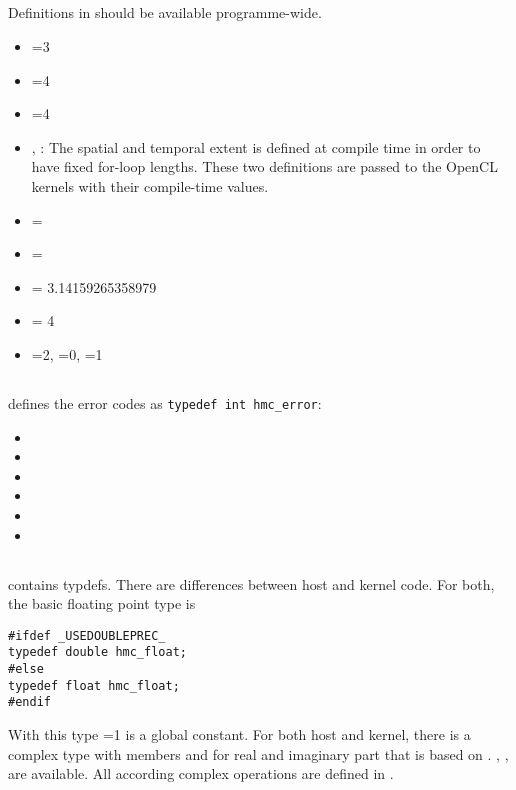 \subsection{}
Definitions in  should be available programme-wide.
\begin{itemize}
\item {}=3
\item {}=4
\item {}=4
\item {}, : The spatial and temporal extent is defined at compile time in order to have fixed for-loop lengths. These two definitions are passed to the OpenCL kernels with their compile-time values.
\item {} = 
\item {} = 
\item {} = 3.14159265358979
\item {} = 4
\item {}=2, =0, =1
\end{itemize}

\subsection{}
 defines the error codes as \verb+typedef int hmc_error+:
\begin{itemize}
\item {}
\item {}
\item {}
\item {}
\item {}
\item {}
\end{itemize}

\subsection{}
 contains typdefs. There are differences between host and kernel code. For both, the basic floating point type is 
\begin{verbatim}
#ifdef _USEDOUBLEPREC_
typedef double hmc_float;
#else
typedef float hmc_float;
#endif
\end{verbatim}
With this type =1 is a global constant. For both host and kernel, there is a complex type  with members  and  for real and imaginary part that is based on . , ,  are available. All according complex operations are defined in .
